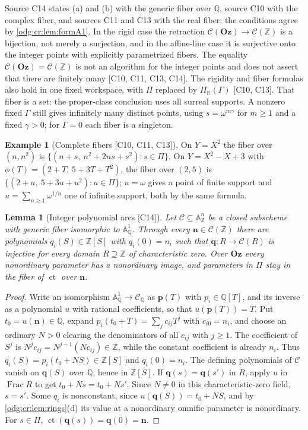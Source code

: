 \documentclass[11pt,oneside]{article}
\numberwithin{equation}{section}
\newtheorem{lemma}[lemma]{Lemma}
\theoremstyle{definition}
\newtheorem{example}[example]{Example}
\theoremstyle{remark}
\newcommand{\Oz}{\mathbf{Oz}}
\newcommand{\Z}{\mathbb Z}
\newcommand{\Q}{\mathbb Q}
\newcommand{\R}{\mathbb R}
\newcommand{\ct}{\operatorname{ct}}
\newcommand{\Frac}{\operatorname{Frac}}
\newcommand{\src}[1]{\textup{\textsf{\small[#1]}}}
\newcommand{\Aff}{\mathbb A}
\begin{document}
Source C14 states (a) and (b) with the generic fiber over $\Q$, source C10 with
the complex fiber, and sources C11 and C13 with the real fiber; the conditions agree
by \cref{odg:cr:lem:formA1}. In the rigid case the retraction
$\mathcal C(\Oz)\to\mathcal C(\Z)$ is a bijection, not merely a surjection, and in
the affine-line case it is surjective onto the integer points with explicitly
parametrized fibers. The equality $\mathcal C(\Oz)=\mathcal C(\Z)$ is not an
algorithm for the integer points and does not assert that there are finitely many
\src{C10, C11, C13, C14}. The rigidity and fiber formulas also hold in one fixed
workspace, with $\Pi$ replaced by $\Pi_\R(\Gamma)$ \src{C10, C13}. That fiber is
a set: the proper-class conclusion uses all surreal supports. A nonzero fixed
$\Gamma$ still gives infinitely many distinct points, using
$s=\omega^{m\gamma}$ for $m\ge1$ and a fixed $\gamma>0$; for $\Gamma=0$ each
fiber is a singleton.

\begin{example}[Complete fibers \src{C10, C11, C13}]\label{odg:cr:ex:fibers}
On $Y=X^2$ the fiber over $(n,n^2)$ is $\{(n+s,\ n^2+2ns+s^2):s\in\Pi\}$. On
$Y=X^2-X+3$ with $\phi(T)=(2+T,\,5+3T+T^2)$, the fiber over $(2,5)$ is
$\{(2+u,\ 5+3u+u^2):u\in\Pi\}$; $u=\omega$ gives a point of finite support and
$u=\sum_{n\ge1}\omega^{1/n}$ one of infinite support, both by the same formula.
\end{example}

\begin{lemma}[Integer polynomial arcs \src{C14}]\label{odg:cr:lem:arcs}
Let $\mathcal C\subseteq\Aff^n_\Z$ be a closed subscheme with generic fiber
isomorphic to $\Aff^1_\Q$.
Through every $\mathbf n\in\mathcal C(\Z)$ there are polynomials $q_i(S)\in\Z[S]$
with $q_i(0)=n_i$ such that $\mathbf q:R\to\mathcal C(R)$ is injective for every
domain $R\supseteq\Z$ of characteristic zero. Over $\Oz$ every nonordinary parameter
has a nonordinary image, and parameters in $\Pi$ stay in the fiber of $\ct$ over
$\mathbf n$.
\end{lemma}
\begin{proof}
Write an isomorphism $\Aff^1_\Q\to\mathcal C_\Q$ as $\mathbf p(T)$ with
$p_i\in\Q[T]$, and its inverse as a polynomial $u$ with rational coefficients, so
that $u(\mathbf p(T))=T$. Put $t_0=u(\mathbf n)\in\Q$, expand
$p_i(t_0+T)=\sum_jc_{ij}T^j$ with $c_{i0}=n_i$, and choose an ordinary $N>0$
clearing the denominators of all $c_{ij}$ with $j\ge1$. The coefficient of
$S^j$ is $N^jc_{ij}=N^{j-1}(Nc_{ij})\in\Z$, while the constant coefficient
is already $n_i$. Thus $q_i(S)=p_i(t_0+NS)\in\Z[S]$ and $q_i(0)=n_i$.
The defining polynomials of $\mathcal C$ vanish on
$\mathbf q(S)$ over $\Q$, hence in $\Z[S]$. If $\mathbf q(s)=\mathbf q(s')$ in $R$,
apply $u$ in $\Frac R$ to get $t_0+Ns=t_0+Ns'$. Since $N\ne0$ in this
characteristic-zero field, $s=s'$. Some $q_i$ is nonconstant, since
$u(\mathbf q(S))=t_0+NS$, and by \cref{odg:cr:lem:rings}(d) its value at a
nonordinary omnific parameter is nonordinary. For $s\in\Pi$,
$\ct(\mathbf q(s))=\mathbf q(0)=\mathbf n$.
\end{proof}
\end{document}
